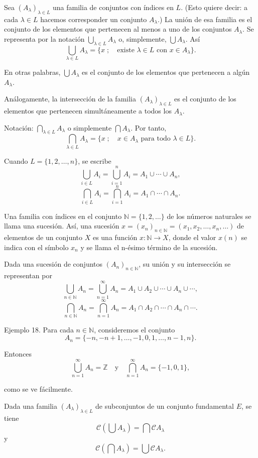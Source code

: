 \documentclass[12pt,oneside]{book}
\begin{document}
Sea \((A_\lambda)_{\lambda \in L}\) una familia de conjuntos con índices en \(L\). (Esto quiere decir: a cada \(\lambda \in L\) hacemos corresponder un conjunto \(A_\lambda\).) La unión de esa familia es el conjunto de los elementos que pertenecen al menos a uno de los conjuntos \(A_\lambda\). Se representa por la notación \(\bigcup_{\lambda \in L} A_\lambda\) o, simplemente, \(\bigcup A_\lambda\). Así
\[
\bigcup_{\lambda \in L} A_\lambda = \{x \; ; \quad \text{existe } \lambda \in L \text{ con } x \in A_\lambda\}.
\]

En otras palabras, \(\bigcup A_\lambda\) es el conjunto de los elementos que pertenecen a algún \(A_\lambda\).

Análogamente, la intersección de la familia \((A_\lambda)_{\lambda \in L}\) es el conjunto de los elementos que pertenecen simultáneamente a todos los \(A_\lambda\).

Notación: \(\bigcap_{\lambda \in L} A_\lambda\) o simplemente \(\bigcap A_\lambda\). Por tanto,
\[
\bigcap_{\lambda \in L} A_\lambda = \{x \; ; \quad x \in A_\lambda \text{ para todo } \lambda \in L\}.
\]

Cuando \(L = \{1, 2, \dots, n\}\), se escribe
\[
\bigcup_{i \in L} A_i = \bigcup_{i=1}^n A_i = A_1 \cup \cdots \cup A_n,
\]
\[
\bigcap_{i \in L} A_i = \bigcap_{i=1}^n A_i = A_1 \cap \cdots \cap A_n.
\]

Una familia con índices en el conjunto \(\mathbb{N} = \{1, 2, \dots\}\) de los números naturales se llama una sucesión. Así, una sucesión \(x = (x_n)_{n \in \mathbb{N}} = (x_1, x_2, \dots, x_n, \dots)\) de elementos de un conjunto \(X\) es una función \(x: \mathbb{N} \to X\), donde el valor \(x(n)\) se indica con el símbolo \(x_n\) y se llama el n-ésimo término de la sucesión.

Dada una sucesión de conjuntos \((A_n)_{n \in \mathbb{N}}\), su unión y su intersección se representan por
\[
\bigcup_{n \in \mathbb{N}} A_n = \bigcup_{n=1}^\infty A_n = A_1 \cup A_2 \cup \cdots \cup A_n \cup \cdots,
\]
\[
\bigcap_{n \in \mathbb{N}} A_n = \bigcap_{n=1}^\infty A_n = A_1 \cap A_2 \cap \cdots \cap A_n \cap \cdots.
\]

Ejemplo 18. Para cada \(n \in \mathbb{N}\), consideremos el conjunto
\[
A_n = \{-n, -n+1, \dots, -1, 0, 1, \dots, n-1, n\}.
\]

Entonces
\[
\bigcup_{n=1}^\infty A_n = \mathbb{Z} \quad \text{y} \quad \bigcap_{n=1}^\infty A_n = \{-1, 0, 1\},
\]

como se ve fácilmente.

Dada una familia \((A_\lambda)_{\lambda \in L}\) de subconjuntos de un conjunto fundamental \(E\), se tiene
\[
\mathcal{C}\left(\bigcup A_\lambda\right) = \bigcap \mathcal{C} A_\lambda
\]
y
\[
\mathcal{C}\left(\bigcap A_\lambda\right) = \bigcup \mathcal{C} A_\lambda.
\]
\end{document}
